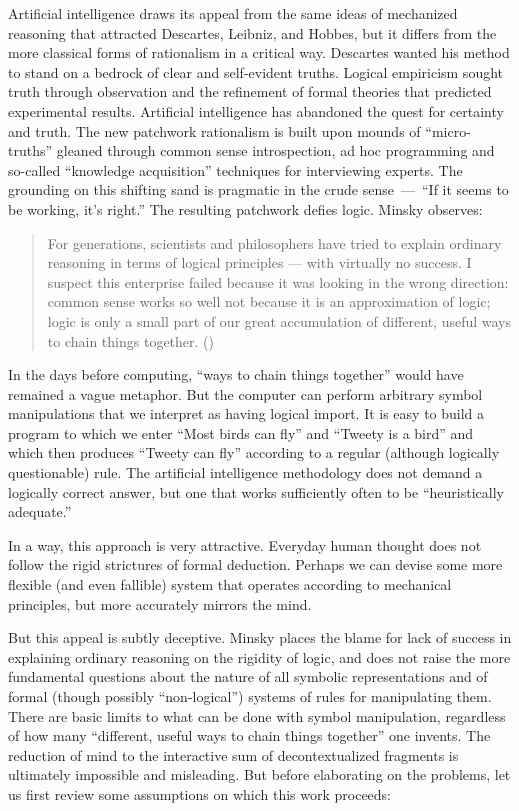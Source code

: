 \documentclass[12pt]{article}
\def\bq{\begin{quote}}
\def\eq{\end{quote}}
\begin{document}
Artificial intelligence draws its appeal from the same ideas of mechanized reasoning that attracted Descartes, Leibniz, and Hobbes, but it differs from the more classical forms of rationalism in a critical way. Descartes wanted his method to stand on a bedrock of clear and self-evident truths. Logical empiricism sought truth through observation and the refinement of formal theories that predicted experimental results. Artificial intelligence has abandoned the quest for certainty and truth. The new patchwork rationalism is built upon mounds of ``micro-truths'' gleaned through common sense introspection, ad hoc programming and so-called ``knowledge acquisition'' techniques for interviewing experts. The grounding on this shifting sand is pragmatic in the crude sense~---~``If it seems to be working, it's right.'' The resulting patchwork defies logic. Minsky observes:

\bq
For generations, scientists and philosophers have tried to explain ordinary reasoning in terms of logical principles --- with virtually no success. I suspect this enterprise failed because it was looking in the wrong direction: common sense works so well not because it is an approximation of logic; logic is only a small part of our great accumulation of different, useful ways to chain things together. ({\it \cite{minsky1986}})
\eq

In the days before computing, ``ways to chain things together'' would have remained a vague metaphor. But the computer can perform arbitrary symbol manipulations that we interpret as having logical import. It is easy to build a program to which we enter ``Most birds can fly'' and ``Tweety is a bird'' and which then produces ``Tweety can fly'' according to a regular (although logically questionable) rule. The artificial intelligence methodology does not demand a logically correct answer, but one that works sufficiently often to be ``heuristically adequate.''

In a way, this approach is very attractive. Everyday human thought does not follow the rigid strictures of formal deduction. Perhaps we can devise some more flexible (and even fallible) system that operates according to mechanical principles, but more accurately mirrors the mind.

But this appeal is subtly deceptive. Minsky places the blame for lack of success in explaining ordinary reasoning on the rigidity of logic, and does not raise the more fundamental questions about the nature of all symbolic representations and of formal (though possibly ``non-logical'') systems of rules for manipulating them. There are basic limits to what can be done with symbol manipulation, regardless of how many ``different, useful ways to chain things together'' one invents. The reduction of mind to the interactive sum of decontextualized fragments is ultimately impossible and misleading. But before elaborating on the problems, let us first review some assumptions on which this work proceeds:
\end{document}
